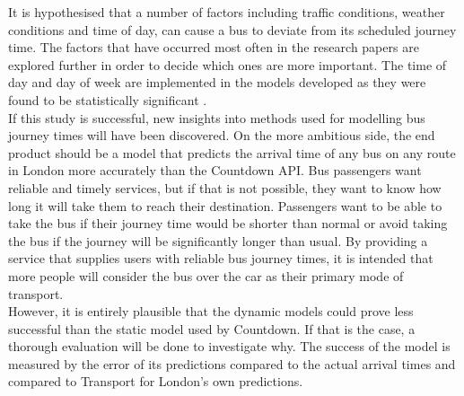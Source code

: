 It is hypothesised that a number of factors including traffic conditions, weather conditions and time of day, can cause a bus to deviate from its scheduled journey time. The factors that have occurred most often in the research papers are explored further in order to decide which ones are more important. The time of day and day of week are implemented in the models developed as they were found to be statistically significant \cite{apc-estimation}. \\

If this study is successful, new insights into methods used for modelling bus journey times will have been discovered. On the more ambitious side, the end product should be a model that predicts the arrival time of any bus on any route in London more accurately than the Countdown API. Bus passengers want reliable and timely services, but if that is not possible, they want to know how long it will take them to reach their destination. Passengers want to be able to take the bus if their journey time would be shorter than normal or avoid taking the bus if the journey will be significantly longer than usual. By providing a service that supplies users with reliable bus journey times, it is intended that more people will consider the bus over the car as their primary mode of transport. \\

However, it is entirely plausible that the dynamic models could prove less successful than the static model used by Countdown. If that is the case, a thorough evaluation will be done to investigate why. The success of the model is measured by the error of its predictions compared to the actual arrival times and compared to Transport for London's own predictions. 

\clearpage

